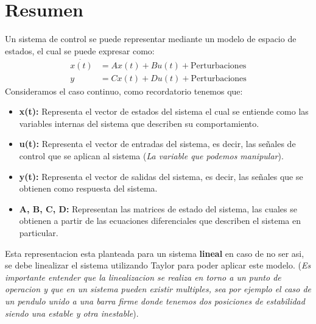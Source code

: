 \documentclass[
  11pt,
  letterpaper,
   addpoints,
   answers
  ]{exam}
\begin{document}
\section{Resumen}
Un sistema de control se puede representar mediante un modelo de espacio de estados, el cual se puede expresar como:
\begin{align}
    \dot{x(t)} &= Ax(t) + Bu(t) + \text{Perturbaciones} \\
    y &= Cx(t) + Du(t) + \text{Perturbaciones}
\end{align}
Consideramos el caso continuo, como recordatorio tenemos que:
\begin{itemize}
    \item \textbf{x(t):} Representa el vector de estados del sistema el cual se entiende como las variables internas del sistema que describen su comportamiento.
    \item \textbf{u(t):} Representa el vector de entradas del sistema, es decir, las señales de control que se aplican al sistema (\textit{La variable que podemos manipular}).
    \item \textbf{y(t):} Representa el vector de salidas del sistema, es decir, las señales que se obtienen como respuesta del sistema.
    \item \textbf{A, B, C, D:} Representan las matrices de estado del sistema, las cuales se obtienen a partir de las ecuaciones diferenciales que describen el sistema en particular.
\end{itemize}
Esta representacion esta planteada para un sistema \textbf{lineal} en caso de no ser asi, se debe linealizar el sistema utilizando Taylor para poder aplicar este modelo. (\textit{Es importante entender que la linealizacion se realiza en torno a un punto de operacion y que en un sistema pueden existir multiples, sea por ejemplo el caso de un pendulo unido a una barra firme donde tenemos dos posiciones de estabilidad siendo una estable y otra inestable}).
\end{document}
